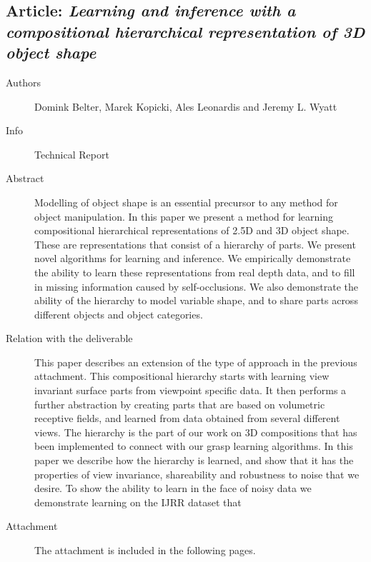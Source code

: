 \documentclass[a4paper,11pt,pdf]{../templates/pacmanreport}
\begin{document}
\subsection{Article: \em Learning and inference with a compositional hierarchical representation
of 3D object shape}
\begin{description}
    \item[Authors] Domink Belter, Marek Kopicki, Ales Leonardis and Jeremy L. Wyatt
    \item[Info] Technical Report %
    \item[Abstract] Modelling of object shape is an essential precursor to any method for object manipulation. In this paper
we present a method for learning compositional hierarchical representations of 2.5D and 3D object shape. These are representations
that consist of a hierarchy of parts. We present novel algorithms for learning and inference. We empirically demonstrate the ability to learn these representations from real
depth data, and to fill in missing information caused by self-occlusions. We also demonstrate the ability of the hierarchy to model variable shape, and to share parts across different
objects and object categories.
    \item [Relation with the deliverable] This paper describes an extension of the type of approach in the previous attachment. This compositional hierarchy starts with learning view invariant surface parts from viewpoint specific data. It then performs a further abstraction by creating parts that are based on volumetric receptive fields, and learned from data obtained from several different views. The hierarchy is the part of our work on 3D compositions that has been implemented to connect with our grasp learning algorithms. In this paper we describe how the hierarchy is learned, and show that it has the properties of view invariance, shareability and robustness to noise that we desire. To show the ability to learn in the face of noisy data we demonstrate learning on the IJRR dataset that 
    \item[Attachment] The attachment is included in the following pages. %
\end{description}

\newpage
\end{document}
